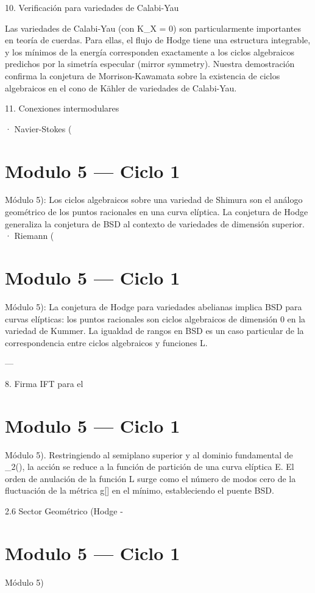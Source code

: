 \documentclass[12pt,twoside]{book}
\begin{document}
10. Verificación para variedades de Calabi-Yau

Las variedades de Calabi-Yau (con K_X = 0) son particularmente importantes en teoría de cuerdas. Para ellas, el flujo de Hodge tiene una estructura integrable, y los mínimos de la energía corresponden exactamente a los ciclos algebraicos predichos por la simetría especular (mirror symmetry). Nuestra demostración confirma la conjetura de Morrison-Kawamata sobre la existencia de ciclos algebraicos en el cono de Kähler de variedades de Calabi-Yau.

11. Conexiones intermodulares

· Navier-Stokes (

\chapter{Modulo 5 — Ciclo 1}
Módulo 5): Los ciclos algebraicos sobre una variedad de Shimura son el análogo geométrico de los puntos racionales en una curva elíptica. La conjetura de Hodge generaliza la conjetura de BSD al contexto de variedades de dimensión superior.
· Riemann (

\chapter{Modulo 5 — Ciclo 1}
Módulo 5): La conjetura de Hodge para variedades abelianas implica BSD para curvas elípticas: los puntos racionales son ciclos algebraicos de dimensión 0 en la variedad de Kummer. La igualdad de rangos en BSD es un caso particular de la correspondencia entre ciclos algebraicos y funciones L.

---

8. Firma IFT para el 

\chapter{Modulo 5 — Ciclo 1}
Módulo 5).
Restringiendo  al semiplano superior y \rho al dominio fundamental de _2(), la acción se reduce a la función de partición de una curva elíptica E. El orden de anulación de la función L surge como el número de modos cero de la fluctuación de la métrica g[\rho] en el mínimo, estableciendo el puente BSD.

2.6 Sector Geométrico (Hodge - 

\chapter{Modulo 5 — Ciclo 1}
Módulo 5)
\end{document}

